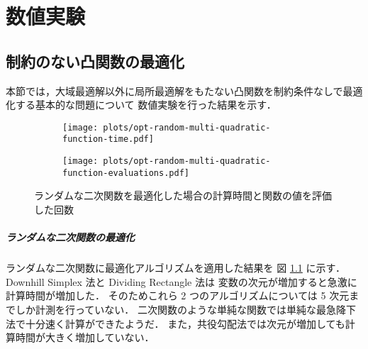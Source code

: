 %

\chapter{数値実験}

\section{制約のない凸関数の最適化}

本節では，大域最適解以外に局所最適解をもたない凸関数を制約条件なしで最適化する基本的な問題について
数値実験を行った結果を示す．

\begin{figure}[tp]
    \centering
    \begin{subfigure}{0.85\linewidth}
        \centering
        \texttt{[image: plots/opt-random-multi-quadratic-function-time.pdf]}
    \end{subfigure}
    \begin{subfigure}{0.85\linewidth}
        \centering
        \texttt{[image: plots/opt-random-multi-quadratic-function-evaluations.pdf]}
    \end{subfigure}
    \caption{ランダムな二次関数を最適化した場合の計算時間と関数の値を評価した回数}
    \label{fig:optimization_unconstrained-convex-optimization_random-multi-quadratic-function}
\end{figure}

\paragraph{ランダムな二次関数の最適化}
ランダムな二次関数に最適化アルゴリズムを適用した結果を
図 \ref{fig:optimization_unconstrained-convex-optimization_random-multi-quadratic-function} に示す．
Downhill Simplex 法と Dividing Rectangle 法は
変数の次元が増加すると急激に計算時間が増加した．
そのためこれら 2 つのアルゴリズムについては 5 次元までしか計測を行っていない．
二次関数のような単純な関数では単純な最急降下法で十分速く計算ができたようだ．
また，共役勾配法では次元が増加しても計算時間が大きく増加していない．

\clearpage
